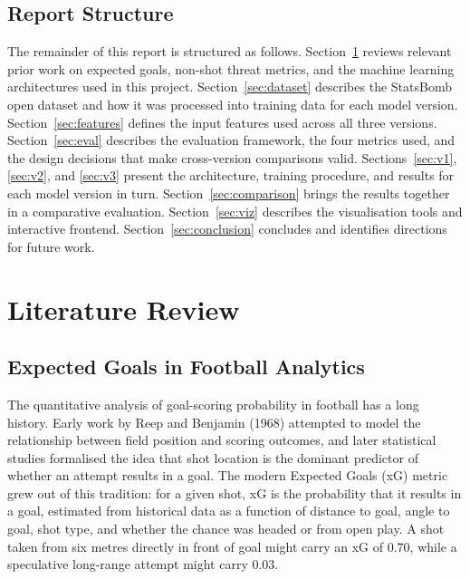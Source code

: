 \documentclass{article}
\begin{document}
\subsection{Report Structure}
The remainder of this report is structured as follows. Section~\ref{sec:litreview} reviews relevant prior work on expected goals, non-shot threat metrics, and the machine learning architectures used in this project. Section~\ref{sec:dataset} describes the StatsBomb open dataset and how it was processed into training data for each model version. Section~\ref{sec:features} defines the input features used across all three versions. Section~\ref{sec:eval} describes the evaluation framework, the four metrics used, and the design decisions that make cross-version comparisons valid. Sections~\ref{sec:v1}, \ref{sec:v2}, and \ref{sec:v3} present the architecture, training procedure, and results for each model version in turn. Section~\ref{sec:comparison} brings the results together in a comparative evaluation. Section~\ref{sec:viz} describes the visualisation tools and interactive frontend. Section~\ref{sec:conclusion} concludes and identifies directions for future work.

\section{Literature Review}\label{sec:litreview}

\subsection{Expected Goals in Football Analytics}

The quantitative analysis of goal-scoring probability in football has a long history. Early work by Reep and Benjamin (1968) \cite{reep1968} attempted to model the relationship between field position and scoring outcomes, and later statistical studies formalised the idea that shot location is the dominant predictor of whether an attempt results in a goal. The modern Expected Goals (xG) metric grew out of this tradition: for a given shot, xG is the probability that it results in a goal, estimated from historical data as a function of distance to goal, angle to goal, shot type, and whether the chance was headed or from open play. A shot taken from six metres directly in front of goal might carry an xG of 0.70, while a speculative long-range attempt might carry 0.03.
\end{document}
